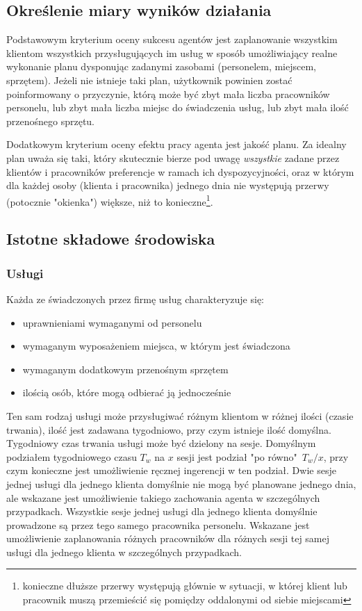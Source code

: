 \subsection{Określenie miary wyników działania}
Podstawowym kryterium oceny sukcesu agentów jest zaplanowanie wszystkim klientom
wszystkich przysługujących im usług w sposób umożliwiający realne wykonanie planu
dysponując zadanymi zasobami (personelem, miejscem, sprzętem).
Jeżeli nie istnieje taki plan, użytkownik powinien zostać poinformowany o przyczynie,
którą może być zbyt mała liczba pracowników personelu, lub zbyt mała liczba miejsc
do świadczenia usług, lub zbyt mała ilość przenośnego sprzętu.

Dodatkowym kryterium oceny efektu pracy agenta jest jakość planu. Za idealny plan
uważa się taki, który skutecznie bierze pod uwagę \emph{wszystkie} zadane przez
klientów i pracowników preferencje w ramach ich dyspozycyjności, oraz w którym
dla każdej osoby (klienta i pracownika) jednego dnia nie występują przerwy
(potocznie "{okienka}") większe, niż to konieczne\footnote{konieczne dłuższe przerwy
występują głównie w sytuacji, w której klient lub pracownik muszą przemieścić się
pomiędzy oddalonymi od siebie miejscami}.

\subsection{Istotne składowe środowiska}

\subsubsection{Usługi}\label{sssec:uslugi}
Każda ze świadczonych przez firmę usług charakteryzuje się:
\begin{itemize}
	\item{uprawnieniami wymaganymi od personelu}
	\item{wymaganym wyposażeniem miejsca, w którym jest świadczona}
	\item{wymaganym dodatkowym przenośnym sprzętem}
	\item{ilością osób, które mogą odbierać ją jednocześnie}
\end{itemize}
Ten sam rodzaj usługi może przysługiwać różnym klientom w różnej ilości (czasie trwania), ilość jest zadawana tygodniowo, przy czym istnieje ilość domyślna.
Tygodniowy czas trwania usługi może być dzielony na sesje. Domyślnym podziałem tygodniowego czasu \( T_w \) na \( x \) sesji jest podział "po równo"\ \( T_w/x \), przy czym konieczne jest umożliwienie ręcznej ingerencji w ten podział.
Dwie sesje jednej usługi dla jednego klienta domyślnie nie mogą być planowane jednego dnia, ale wskazane jest umożliwienie takiego zachowania agenta w szczególnych przypadkach.
Wszystkie sesje jednej usługi dla jednego klienta domyślnie prowadzone są przez tego samego pracownika personelu. Wskazane jest umożliwienie zaplanowania różnych pracowników dla różnych sesji tej samej usługi dla jednego klienta w szczególnych przypadkach.

